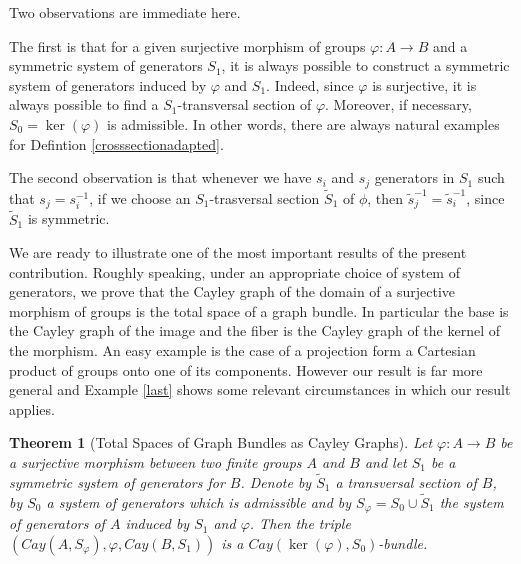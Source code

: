 \documentclass{amsart}
\newtheorem{thm}[theo]{Theorem}
\theoremstyle{definition}
\numberwithin{equation}{section}
\begin{document}
Two observations are immediate here. 


The first  is that for a given  surjective morphism of groups $\varphi : A \longrightarrow B$ and a symmetric system of generators $S_1$, it is always possible to construct a symmetric system of generators induced by $\varphi$ and $S_1$. Indeed, since $\varphi$ is surjective, it is always possible to find a $S_1$-transversal section of $\varphi$. Moreover, if necessary, $S_0 = \ker(\varphi)$ is admissible. In other words, there are always natural examples for Defintion \ref{crosssectionadapted}. 


The second observation is that  whenever we have $s_i$ and $s_j$  generators in $S_1$ such that $s_j = s_i^{-1}$, if we choose an $S_1$-trasversal section $\widetilde{S}_1$ of $\phi$, then $\widetilde{s}_j^{-1} = \widetilde{s}_i^{-1}$, since $\widetilde{S}_1$ is symmetric.



We are ready to illustrate one of the most important results of the present contribution. Roughly speaking, under an appropriate choice of system of generators, we prove that the Cayley graph of the domain of a surjective morphism of groups is the total space of a graph bundle. In particular the base  is the Cayley graph of the image and the fiber is the Cayley graph of the kernel  of the morphism. An easy example is the case of a projection form a Cartesian product of groups onto one of its components. However our result is far more general and  Example \ref{last} shows some relevant circumstances in which our result applies.

\begin{thm}[Total Spaces of Graph Bundles as Cayley Graphs]\label{6thmaintheorem}
Let $\varphi: A \longrightarrow B$ be a surjective morphism between two finite groups $A$ and $B$ and let $S_1$ be a symmetric system of generators for $B$. Denote by $\widetilde{S}_1$ a transversal section of $B$, by $S_0$ a system of generators which is admissible and by $S_\varphi = S_0 \cup \widetilde{S}_1$ the system of generators of $A$ induced by $S_1$ and $\varphi$. Then the triple $(Cay(A, S_{\varphi}), \varphi, Cay(B, S_1))$ is a $Cay(\ker(\varphi), S_0)$-bundle.
\end{thm}
\end{document}
